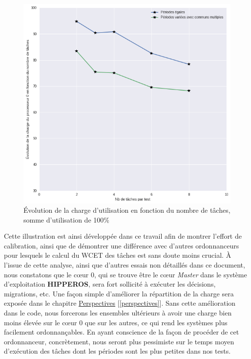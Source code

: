 \begin{figure}[H]
	\label{evowcethomogene}
	\caption{Évolution de la charge d'utilisation en fonction du nombre de tâches, somme d'utilisation de 100$\%$}
	\includegraphics[scale=0.6]{img/wcet/load_100u}
\end{figure}

Cette illustration est ainsi développée dans ce travail afin de montrer l'effort de calibration, ainsi que 
de démontrer une différence avec d'autres ordonnanceurs pour lesquels le calcul du WCET des tâches est 
sans doute moins crucial. À l'issue de cette analyse, ainsi que d'autres essais non détaillés dans ce 
document, nous constatons que le cœur $0$, qui se trouve être le cœur \textit{Master} dans le système d'exploitation \textbf{HIPPEROS}, 
sera fort sollicité à exécuter les décisions, migrations, etc. Une façon simple d'améliorer la répartition de la 
charge sera exposée dans le chapitre \hyperref[perspectives]{Perspectives} [\ref{perspectives}]. 
Sans cette amélioration dans le code, nous forcerons les ensembles ultérieurs 
à avoir une charge bien moins élevée sur le cœur $0$ que sur les autres, ce qui rend les systèmes 
plus facilement ordonnançables. En ayant conscience de la façon de procéder de cet ordonnanceur, 
concrètement, nous seront plus pessimiste sur le temps moyen d'exécution des tâches 
dont les périodes sont les plus petites dans nos tests.